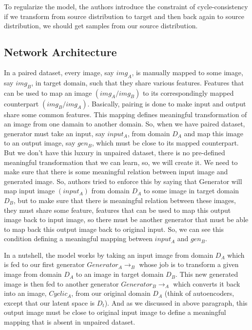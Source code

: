 \documentclass[peerreview]{IEEEtran}
\begin{document}
To regularize the model, the authors introduce the constraint of cycle-consistency if we transform from source distribution to target and then back again to source distribution, we should get samples from our source distribution.

\subsection{Network Architecture}
In a paired dataset, every image, say $img_A$, is manually mapped to some image, say $img_B$, in target domain, such that they share various features. Features that can be used to map an image $(img_A/img_B)$ to its correspondingly mapped counterpart $(img_B/img_A)$. Basically, pairing is done to make input and output share some common features. This mapping defines meaningful transformation of an image from one damain to another domain. So, when we have paired dataset, generator must take an input, say $input_A$, from domain $D_A$ and map this image to an output image, say $gen_B$, which must be close to its mapped counterpart. But we don't have this luxury in unpaired dataset, there is no pre-defined meaningful transformation that we can learn, so, we will create it. We need to make sure that there is some meaningful relation between input image and generated image. So, authors tried to enforce this by saying that Generator will map input image $(input_A)$ from domain $D_A$ to some image in target domain $D_B$, but to make sure that there is meaningful relation between these images, they must share some feature, features that can be used to map this output image back to input image, so there must be another generator that must be able to map back this output image back to original input. So, we can see this condition defining a meaningful mapping between $input_A$ and $gen_B$.

In a nutshell, the model works by taking an input image from domain $D_A$ which is fed to our first generator $Generator_A\to_B$ whose job is to transform a given image from domain $D_A$ to an image in target domain $D_B$. This new generated image is then fed to another generator $Generator_B\to_A$ which converts it back into an image, $Cyclic_A$, from our original domain $D_A$ (think of autoencoders, except that our latent space is $D_t$). And as we discussed in above paragraph, this output image must be close to original input image to define a meaningful mapping that is absent in unpaired dataset.
\end{document}
